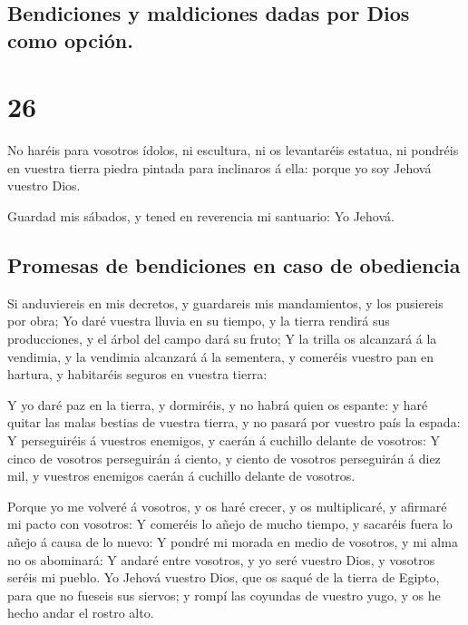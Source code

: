 \hypertarget{bendiciones-y-maldiciones-dadas-por-dios-como-opciuxf3n.}{%
\subsection{Bendiciones y maldiciones dadas por Dios como
opción.}\label{bendiciones-y-maldiciones-dadas-por-dios-como-opciuxf3n.}}

\hypertarget{section-25}{%
\section{26}\label{section-25}}

 No haréis para vosotros ídolos, ni escultura, ni os
levantaréis estatua, ni pondréis en vuestra tierra piedra pintada para
inclinaros á ella: porque yo soy Jehová vuestro Dios.

 Guardad mis sábados, y tened en reverencia mi santuario: Yo
Jehová.

\hypertarget{promesas-de-bendiciones-en-caso-de-obediencia}{%
\subsection{Promesas de bendiciones en caso de
obediencia}\label{promesas-de-bendiciones-en-caso-de-obediencia}}

 Si anduviereis en mis decretos, y guardareis mis
mandamientos, y los pusiereis por obra;  Yo daré vuestra
lluvia en su tiempo, y la tierra rendirá sus producciones, y el árbol
del campo dará su fruto;  Y la trilla os alcanzará á la
vendimia, y la vendimia alcanzará á la sementera, y comeréis vuestro pan
en hartura, y habitaréis seguros en vuestra tierra:

 Y yo daré paz en la tierra, y dormiréis, y no habrá quien
os espante: y haré quitar las malas bestias de vuestra tierra, y no
pasará por vuestro país la espada:  Y perseguiréis á
vuestros enemigos, y caerán á cuchillo delante de vosotros: 
Y cinco de vosotros perseguirán á ciento, y ciento de vosotros
perseguirán á diez mil, y vuestros enemigos caerán á cuchillo delante de
vosotros.

 Porque yo me volveré á vosotros, y os haré crecer, y os
multiplicaré, y afirmaré mi pacto con vosotros:  Y comeréis
lo añejo de mucho tiempo, y sacaréis fuera lo añejo á causa de lo nuevo:
 Y pondré mi morada en medio de vosotros, y mi alma no os
abominará:  Y andaré entre vosotros, y yo seré vuestro
Dios, y vosotros seréis mi pueblo.  Yo Jehová vuestro Dios,
que os saqué de la tierra de Egipto, para que no fueseis sus siervos; y
rompí las coyundas de vuestro yugo, y os he hecho andar el rostro alto.

